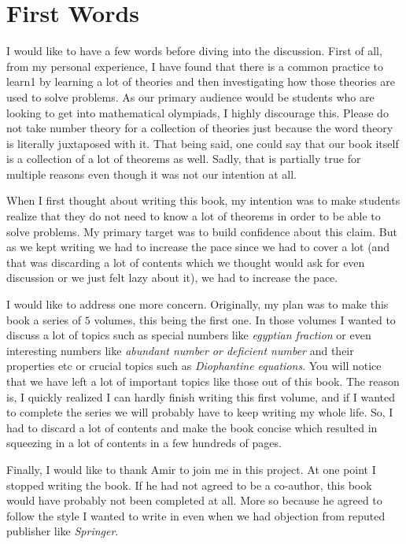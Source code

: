 \documentclass[12pt]{book}
\begin{document}
\newpage
\section*{First Words}


I would like to have a few words before diving into the discussion. First of all, from my personal experience, I have found that there is a common practice to learn1 by learning a lot of theories and then investigating how those theories are used to solve problems. As our primary audience would be students who are looking to get into mathematical olympiads, I highly discourage this. Please do not take number theory for a collection of theories just because the word theory is literally juxtaposed with it. That being said, one could say that our book itself is a collection of a lot of theorems as well. Sadly, that is partially true for multiple reasons even though it was not our intention at all.


When I first thought about writing this book, my intention was to make students realize that they do not need to know a lot of theorems in order to be able to solve problems. My primary target was to build confidence about this claim. But as we kept writing we had to increase the pace since we had to cover a lot (and that was  discarding a lot of contents which we thought would ask for even discussion or we just felt lazy about it), we had to increase the pace.


I would like to address one more concern. Originally, my plan was to make this book a series of $5$ volumes, this being the first one. In those volumes I wanted to discuss a lot of topics such as special numbers like \textit{egyptian fraction} or even interesting numbers like \textit{abundant number or deficient number} and their properties etc or crucial topics such as \textit{Diophantine equations}. You will notice that we have left a lot of important topics like those out of this book. The reason is, I quickly realized I can hardly finish writing this first volume, and if I wanted to complete the series we will probably have to keep writing my whole life. So, I had to discard a lot of contents and make the book concise which resulted in squeezing in a lot of contents in a few hundreds of pages. 


Finally, I would like to thank Amir to join me in this project. At one point I stopped writing the book. If he had not agreed to be a co-author, this book would have probably not been completed at all. More so because he agreed to follow the style I wanted to write in even when we had objection from reputed publisher like \textit{Springer}.
\end{document}
